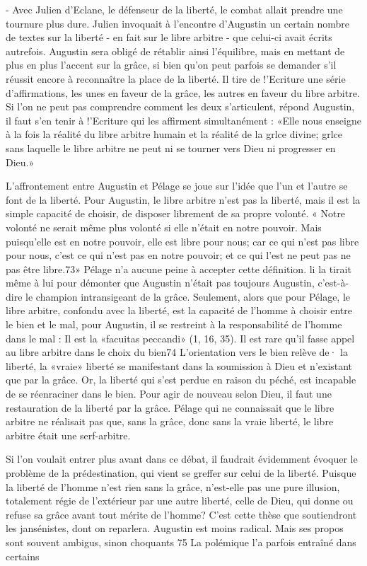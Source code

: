 -  Avec  Julien d'Eclane, le défenseur  de la liberté, le combat allait prendre une tournure plus dure. Julien invoquait à l'encontre d'Augustin un certain nombre de textes  sur la liberté - en fait sur le libre arbitre - que celui-ci avait écrits autrefois. Augustin sera obligé de rétablir ainsi l'équilibre, mais en mettant de plus en plus l'accent sur la grâce, si bien qu'on peut parfois se demander s'il réussit encore à reconnaître la place de la liberté. Il tire de !'Ecriture une série d'affirmations, les unes en faveur de la grâce, les autres en faveur du libre arbitre. Si l'on ne peut pas comprendre comment les deux s'articulent, répond Augustin, il faut s'en tenir à !'Ecriture qui les affirment simultanément : «Elle nous enseigne à la fois la réalité du libre arbitre humain et la réalité de la grlce divine; grlce sans laquelle le libre arbitre ne peut ni se tourner vers Dieu ni progresser en Dieu.»

L'affrontement entre Augustin et Pélage se joue sur l'idée que l'un et l'autre se font  de la liberté. Pour Augustin, le libre arbitre n'est pas la liberté, mais il est  la simple capacité de choisir,  de disposer librement de sa propre volonté.
« Notre volonté ne serait même plus volonté si elle n'était en notre pouvoir. Mais puisqu'elle est en notre pouvoir, elle est libre pour nous; car ce qui n'est pas libre pour nous, c'est ce qui n'est pas en notre pouvoir; et ce qui l'est ne peut pas ne pas être libre.73» Pélage n'a aucune peine à accepter cette définition. li la tirait même à lui pour démonter que Augustin n'était pas toujours Augustin, c'est-à-dire le champion intransigeant de la grâce. Seulement, alors que pour Pélage, le libre arbitre, confondu avec la liberté, est la capacité de l'homme à choisir entre le bien et le mal, pour Augustin, il se restreint  à la responsabilité de l'homme dans le mal : Il est la
«facuitas peccandi» (1, 16, 35).  Il est rare qu'il fasse appel au libre arbitre dans le choix du bien74   L'orientation vers le bien relève de· la liberté, la  «vraie»  liberté se manifestant dans la soumission à Dieu et n'existant que par la grâce. Or, la liberté qui s'est perdue en raison du péché, est incapable de se réenraciner dans le bien. Pour agir de nouveau selon Dieu, il faut une restauration de la liberté par la grâce. Pélage qui ne connaissait que le libre arbitre ne réalisait pas que, sans la grâce, donc sans la vraie liberté,  le libre arbitre était une serf-arbitre.

Si l'on voulait entrer plus avant dans ce débat, il faudrait évidemment évoquer le problème  de  la  prédestination, qui vient se greffer sur celui de la liberté. Puisque la liberté de l'homme n'est rien sans la grâce, n'est-elle pas une pure illusion, totalement régie de l'extérieur par une autre liberté, celle de Dieu, qui donne ou refuse sa grâce avant tout mérite de l'homme? C'est cette thèse que soutiendront les jansénistes, dont on reparlera. Augustin est moins radical. Mais ses propos sont souvent ambigus, sinon choquants 75   La polémique l'a parfois entraîné dans certains

